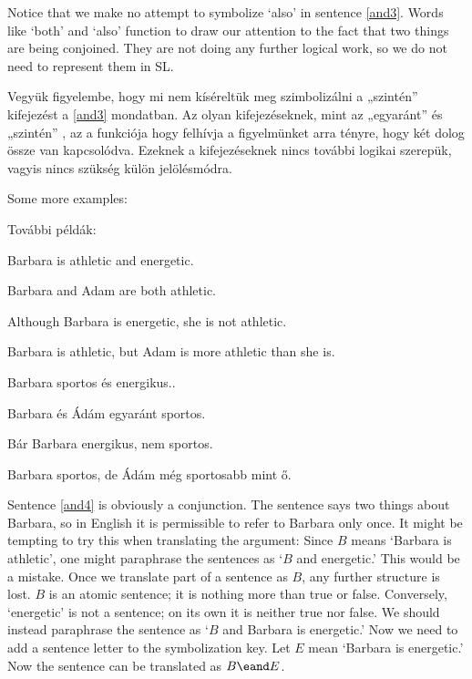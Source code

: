 Notice that we make no attempt to symbolize `also' in sentence \ref{and3}.
Words like `both' and `also' function to draw our attention to the fact that two things are being conjoined. They are not doing any further logical work, so we do not need to represent them in SL.

Vegyük figyelembe, hogy mi nem kíséreltük meg szimbolizálni a „szintén” kifejezést a \ref{and3} mondatban.
Az olyan kifejezéseknek, mint az „egyaránt” és „szintén” , az a funkciója hogy felhívja a figyelmünket arra tényre, hogy két dolog össze van kapcsolódva.
Ezeknek a kifejezéseknek nincs további logikai szerepük, vagyis nincs szükség külön jelölésmódra.

Some more examples:

További példák:

\begin{earg}
\item[\ex{and4}]Barbara is athletic and energetic.
\item[\ex{and5}]Barbara and Adam are both athletic.
\item[\ex{and6}]Although Barbara is energetic, she is not athletic.
\item[\ex{and7}]Barbara is athletic, but Adam is more athletic than she is.
\end{earg}

\begin{earg}
\item[\ex{and4}]Barbara sportos és energikus..
\item[\ex{and5}]Barbara és Ádám egyaránt sportos.
\item[\ex{and6}]Bár Barbara energikus, nem sportos.
\item[\ex{and7}]Barbara sportos, de Ádám még sportosabb mint ő.
\end{earg}

Sentence \ref{and4} is obviously a conjunction. 
The sentence says two things about Barbara, so in English it is permissible to refer to Barbara only once. 
It might be tempting to try this when translating the argument: Since $B$ means `Barbara is athletic', one might paraphrase the sentences as `$B$ and energetic.' 
This would be a mistake. 
Once we translate part of a sentence as $B$, any further structure is lost.
$B$ is an atomic sentence; it is nothing more than true or false. 
Conversely, `energetic' is not a sentence; on its own it is neither true nor false.
We should instead paraphrase the sentence as `$B$ and Barbara is energetic.' 
Now we need to add a sentence letter to the symbolization key. 
Let $E$ mean `Barbara is energetic.' Now the sentence can be translated as $B\eand E$.

